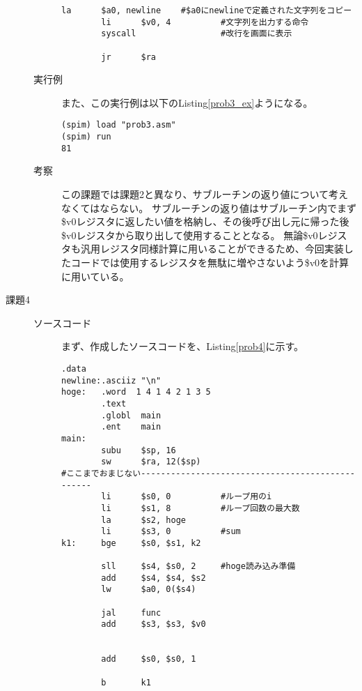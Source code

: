\documentclass{jsarticle}
\begin{document}
\begin{description}
\begin{description}
\begin{lstlisting}[caption=課題3のソースコード, label=prob3]
        la      $a0, newline    #$a0にnewlineで定義された文字列をコピー
        li      $v0, 4          #文字列を出力する命令
        syscall                 #改行を画面に表示

        jr      $ra
            \end{lstlisting}

            \item[実行例]
            また、この実行例は以下のListing\ref{prob3_ex}ようになる。
            \begin{lstlisting}[caption=課題3の実行例, label=prob3_ex]
(spim) load "prob3.asm"
(spim) run
81
            \end{lstlisting}

            \item[考察]
            この課題では課題2と異なり、サブルーチンの返り値について考えなくてはならない。
            サブルーチンの返り値はサブルーチン内でまず\$v0レジスタに返したい値を格納し、その後呼び出し元に帰った後\$v0レジスタから取り出して使用することとなる。
            無論\$v0レジスタも汎用レジスタ同様計算に用いることができるため、今回実装したコードでは使用するレジスタを無駄に増やさないよう\$v0を計算に用いている。
            \\
          \end{description}

        \item[課題4]
        \begin{description}
            \item[ソースコード]
            まず、作成したソースコードを、Listing\ref{prob4}に示す。
            \begin{lstlisting}[caption=課題4のソースコード, label=prob4]
        .data
newline:.asciiz "\n"
hoge:   .word  1 4 1 4 2 1 3 5
        .text
        .globl  main
        .ent    main
main:
        subu    $sp, 16
        sw      $ra, 12($sp)
#ここまでおまじない-------------------------------------------------
        li      $s0, 0          #ループ用のi
        li      $s1, 8          #ループ回数の最大数
        la      $s2, hoge
        li      $s3, 0          #sum
k1:     bge     $s0, $s1, k2

        sll     $s4, $s0, 2     #hoge読み込み準備
        add     $s4, $s4, $s2
        lw      $a0, 0($s4)

        jal     func
        add     $s3, $s3, $v0


        add     $s0, $s0, 1

        b       k1


\end{lstlisting}
\end{description}
\end{description}
\end{document}
